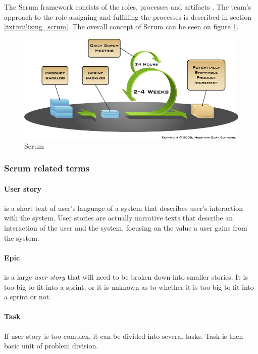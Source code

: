 The Scrum framework consists of the roles, processes and artifacts \cite{viscardi2013professional}. The team's approach to the role assigning and fulfilling the processes is described in section \ref{txt:utilizing_scrum}. The overall concept of Scrum can be seen on figure \ref{fig:scrum}.

\begin{figure}[ht]
\centering
\includegraphics[width=\textwidth]{preliminaryStudies/scrum.png}
\caption{Scrum}
\label{fig:scrum}
\end{figure}

\subsubsection{Scrum related terms}

\paragraph{User story}
is a short text of user's language of a system that describes user's interaction with the system. User stories are actually narrative texts that describe an interaction of the user and the system, focusing on the value a user gains from the system.

\paragraph{Epic}
is a large \emph{user story} that will need to be broken down into smaller stories. It is too big to fit into a sprint, or it is unknown as to whether it is too big to fit into a sprint or not.

\paragraph{Task}
If user story is too complex, it can be divided into several tasks. 
Task is then basic unit of problem division.

